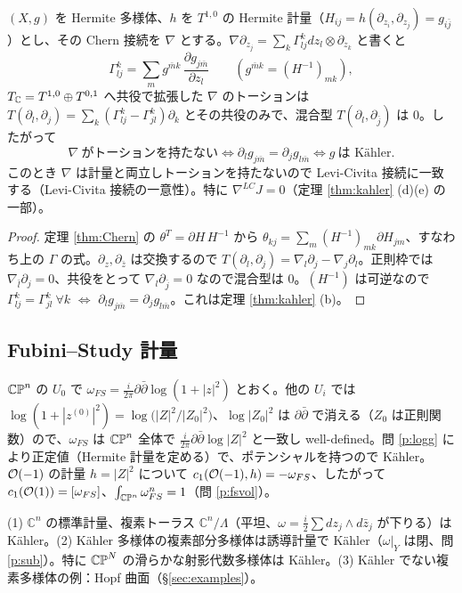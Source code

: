 \begin{prop}\label{prop:torsion}\tP
$(X,g)$ を Hermite 多様体、$h$ を $T^{1,0}$ の Hermite 計量（$H_{ij}=h(\partial_{z_i},\partial_{z_j})=g_{i\bar j}$）とし、その Chern 接続を $\nabla$ とする。$\nabla\partial_{z_j}=\sum_k\Gamma^k_{lj}dz_l\otimes\partial_{z_k}$ と書くと
\[
\Gamma^k_{lj}=\sum_m g^{\bar mk}\,\frac{\partial g_{j\bar m}}{\partial z_l}\qquad(g^{\bar mk}=(H^{-1})_{mk}),
\]
$T_{\mathbb C}=T^{1,0}\oplus T^{0,1}$ へ共役で拡張した $\nabla$ のトーションは $T(\partial_l,\partial_j)=\sum_k(\Gamma^k_{lj}-\Gamma^k_{jl})\partial_k$ とその共役のみで、混合型 $T(\partial_l,\partial_{\bar j})$ は $0$。したがって
\[
\nabla\ \text{がトーションを持たない}\iff\partial_lg_{j\bar m}=\partial_jg_{l\bar m}\iff g\ \text{は Kähler}.
\]
このとき $\nabla$ は計量と両立しトーションを持たないので Levi-Civita 接続に一致する（Levi-Civita 接続の一意性）。特に $\nabla^{LC}J=0$（定理 \ref{thm:kahler} (d)(e) の一部）。
\end{prop}
\begin{proof}
定理 \ref{thm:Chern} の $\theta^T=\partial H\,H^{-1}$ から $\theta_{kj}=\sum_m(H^{-1})_{mk}\partial H_{jm}$、すなわち上の $\Gamma$ の式。$\partial_z,\partial_{\bar z}$ は交換するので $T(\partial_l,\partial_j)=\nabla_l\partial_j-\nabla_j\partial_l$。正則枠では $\nabla_{\bar l}\partial_j=0$、共役をとって $\nabla_l\partial_{\bar j}=0$ なので混合型は $0$。$(H^{-1})$ は可逆なので $\Gamma^k_{lj}=\Gamma^k_{jl}\ \forall k$ $\iff$ $\partial_lg_{j\bar m}=\partial_jg_{l\bar m}$。これは定理 \ref{thm:kahler} (b)。\qedhere
\end{proof}


\subsection{Fubini--Study 計量}
\begin{ex}\label{ex:FS}
$\mathbb{CP}^n$ の $U_0$ で $\omega_{FS}=\frac i{2\pi}\partial\bar\partial\log(1+|z|^2)$ とおく。他の $U_i$ では $\log(1+|z^{(0)}|^2)=\log\big(|Z|^2/|Z_0|^2\big)$、$\log|Z_0|^2$ は $\partial\bar\partial$ で消える（$Z_0$ は正則関数）ので、$\omega_{FS}$ は $\mathbb{CP}^n$ 全体で $\frac i{2\pi}\partial\bar\partial\log|Z|^2$ と一致し well-defined。問 \ref{p:logg} により正定値（Hermite 計量を定める）で、ポテンシャルを持つので Kähler。$\mathcal O(-1)$ の計量 $h=|Z|^2$ について $c_1(\mathcal O(-1),h)=-\omega_{FS}$、したがって $c_1(\mathcal O(1))=[\omega_{FS}]$、$\int_{\mathbb{CP}^n}\omega_{FS}^n=1$（問 \ref{p:fsvol}）。
\end{ex}
\begin{ex}[その他]
(1) $\mathbb C^n$ の標準計量、複素トーラス $\mathbb C^n/\Lambda$（平坦、$\omega=\frac i2\sum dz_j\wedge d\bar z_j$ が下りる）は Kähler。(2) Kähler 多様体の複素部分多様体は誘導計量で Kähler（$\omega|_Y$ は閉、問 \ref{p:sub}）。特に $\mathbb{CP}^N$ の滑らかな射影代数多様体は Kähler。(3) Kähler でない複素多様体の例：Hopf 曲面（§\ref{sec:examples}）。
\end{ex}


